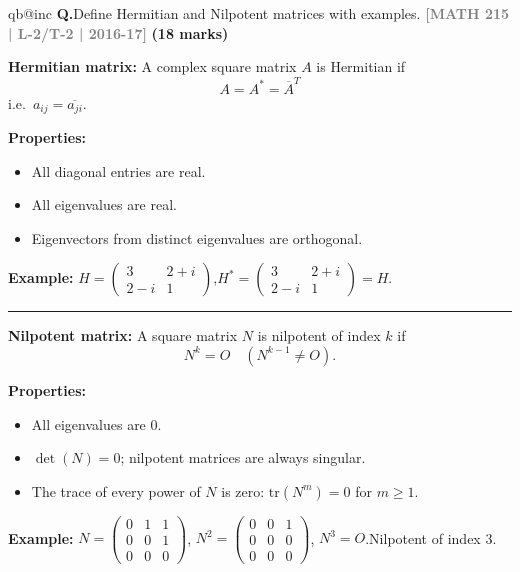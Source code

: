 \documentclass[12pt,a3paper]{article}
\makeatletter
\newcommand{\yr}[1]{\hfill\textcolor{gray}{\small\textbf{[#1]}}}
\newcommand{\mk}[1]{\textcolor{orange!70!black}{\small\textbf{(#1 marks)}}}
\newcounter{qnum}
\newcommand{\Q}[1]{%
  \csname qb@inc\endcsname
  \needspace{4\baselineskip}
  \refstepcounter{qnum}
  \vspace{6pt}
  \noindent\textbf{Q\theqnum.}\enspace #1\par
}
\makeatother
\begin{document}
\Q{Define Hermitian and Nilpotent matrices with examples.
\yr{MATH 215 | L-2/T-2 | 2016-17} \mk{18}}

\begin{tcolorbox}[enhanced,breakable,
  colback=cA!4,colframe=cA,boxrule=0.8pt,arc=5pt,
  title={\textbf{Answer --- Hermitian and Nilpotent Matrices}},
  fonttitle=\bfseries\color{white},colbacktitle=cA]
 
\textbf{Hermitian matrix:} A complex square matrix $A$ is Hermitian if
\[
  A = A^* = \overline{A}^T
\]
i.e.\ $a_{ij} = \overline{a_{ji}}$.
 
\textbf{Properties:}
\begin{itemize}[itemsep=2pt]
  \item All diagonal entries are real.
  \item All eigenvalues are real.
  \item Eigenvectors from distinct eigenvalues are orthogonal.
\end{itemize}
 
\textbf{Example:}
$H = \begin{pmatrix}3 & 2+i \\ 2-i & 1\end{pmatrix}$,\quad $H^* = \begin{pmatrix}3 & 2+i \\ 2-i & 1\end{pmatrix} = H$. \checkmark
 
\medskip
\textcolor{cA}{\rule{\textwidth}{0.4pt}}
 
\textbf{Nilpotent matrix:} A square matrix $N$ is nilpotent of index $k$ if
\[
  N^k = O \quad (N^{k-1}\neq O).
\]
 
\textbf{Properties:}
\begin{itemize}[itemsep=2pt]
  \item All eigenvalues are 0.
  \item $\det(N) = 0$; nilpotent matrices are always singular.
  \item The trace of every power of $N$ is zero: $\mathrm{tr}(N^m)=0$ for $m\geq 1$.
\end{itemize}
 
\textbf{Example:}
$N = \begin{pmatrix}0&1&1\\0&0&1\\0&0&0\end{pmatrix}$,\quad
$N^2 = \begin{pmatrix}0&0&1\\0&0&0\\0&0&0\end{pmatrix}$,\quad
$N^3 = O$.\quad Nilpotent of index 3.
 
\end{tcolorbox}
\end{document}
